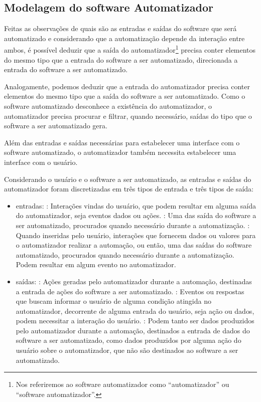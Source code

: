 \documentclass[tg]{mdtufsm}
\begin{document}
            \subsection{Modelagem do software Automatizador}

                Feitas as observações de quais são as entradas e saídas do software que será automatizado e considerando que a automatização depende da interação entre ambos, é possível deduzir que a saída do automatizador\footnote{ Nos referiremos ao software automatizador como “automatizador” ou “software automatizador”.} precisa conter elementos do mesmo tipo que a entrada do software a ser automatizado, direcionada a entrada do software a ser automatizado.

                Analogamente, podemos deduzir que a entrada do automatizador precisa conter elementos do mesmo tipo que a saída do software a ser automatizado. Como o software automatizado desconhece a existência do automatizador, o automatizador precisa procurar e filtrar, quando necessário, saídas do tipo que o software a ser automatizado gera.

                Além das entradas e saídas necessárias para estabelecer uma interface com o software automatizado, o automatizador também necessita estabelecer uma interface com o usuário.

                Considerando o usuário e o software a ser automatizado, as entradas e saídas do automatizador foram discretizadas em três tipos de entrada e três tipos de saída:

                \begin{itemize}
                    \item entradas:
                        : Interações vindas do usuário, que podem resultar em alguma saída do automatizador, seja eventos dados ou ações.
                        : Uma das saída do software a ser automatizado, procurados quando necessário durante a automatização.
                        : Quando inseridas pelo usuário, interações que fornecem dados ou valores para o automatizador realizar a automação, ou então, uma das saídas do software automatizado, procurados quando necessário durante a automatização. Podem resultar em algum evento no automatizador.
                    \item saídas:
                        : Ações geradas pelo automatizador durante a automação, destinadas a entrada de ações do software a ser automatizado.
                        : Eventos ou respostas que buscam informar o usuário de alguma condição atingida no automatizador, decorrente de alguma entrada do usuário, seja ação ou dados, podem necessitar a interação do usuário.
                        : Podem tanto ser dados produzidos pelo automatizador durante a automação, destinados a entrada de dados do software a ser automatizado, como dados produzidos por alguma ação do usuário sobre o automatizador, que não são destinados ao software a ser automatizado.
                \end{itemize}
\end{document}
